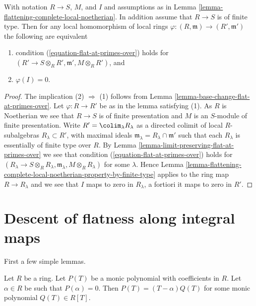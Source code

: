 \begin{lemma}
\label{lemma-flattening-complete-local-universal-property}
With notation $R \to S$, $M$, and $I$ and assumptions as in
Lemma \ref{lemma-flattening-complete-local-noetherian}.
In addition assume that $R \to S$ is of finite type.
Then for any local homomorphism of local rings
$\varphi : (R, \mathfrak m) \to (R', \mathfrak m')$
the following are equivalent
\begin{enumerate}
\item condition (\ref{equation-flat-at-primes-over}) holds
for $(R' \to S \otimes_R R', \mathfrak m', M \otimes_R R')$, and
\item $\varphi(I) = 0$.
\end{enumerate}
\end{lemma}

\begin{proof}
The implication (2) $\Rightarrow$ (1) follows from
Lemma \ref{lemma-base-change-flat-at-primes-over}.
Let $\varphi : R \to R'$ be as in the lemma satisfying (1).
As $R$ is Noetherian we see that $R \to S$ is of finite presentation
and $M$ is an $S$-module of finite presentation.
Write $R' = \colim_\lambda R_\lambda$
as a directed colimit of local $R$-subalgebras $R_\lambda \subset R'$,
with maximal ideals $\mathfrak m_\lambda = R_\lambda \cap \mathfrak m'$
such that each $R_\lambda$ is essentially of finite type over $R$. By
Lemma \ref{lemma-limit-preserving-flat-at-primes-over}
we see that condition (\ref{equation-flat-at-primes-over}) holds for
$(R_\lambda \to S \otimes_R R_\lambda, \mathfrak m_\lambda,
M \otimes_R R_\lambda)$ for some $\lambda$. Hence
Lemma \ref{lemma-flattening-complete-local-noetherian-property-by-finite-type}
applies to the ring map $R \to R_\lambda$ and we see that
$I$ maps to zero in $R_\lambda$, a fortiori it maps to zero in $R'$.
\end{proof}




\section{Descent of flatness along integral maps}
\label{section-descent-flatness-integral}

\noindent
First a few simple lemmas.

\begin{lemma}
\label{lemma-have-one-root}
Let $R$ be a ring. Let $P(T)$ be a monic polynomial with coefficients
in $R$. Let $\alpha \in R$ be such that $P(\alpha) = 0$. Then
$P(T) = (T - \alpha)Q(T)$ for some monic polynomial $Q(T) \in R[T]$.
\end{lemma}

